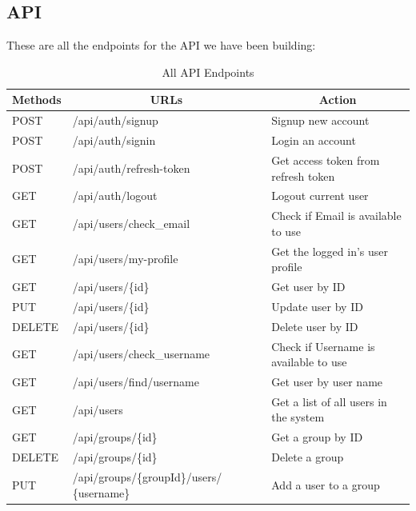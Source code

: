 \subsection{API}
These are all the endpoints for the API we have been building: 
\begin{longtable}{|p{2cm}|p{5cm}|p{5cm}|}
\caption{All API Endpoints}
\label{table:APIendpoints} \\

\hline \multicolumn{1}{|c|}{\textbf{Methods}} & \multicolumn{1}{c|}{\textbf{URLs}} & \multicolumn{1}{c|}{\textbf{Action}} \\ \hline 
\endfirsthead
  \hline 
POST & /api/auth/signup & Signup new account\\ \hline
POST & /api/auth/signin & Login an account\\ \hline
POST & /api/auth/refresh-token & Get access token from refresh token \\ \hline
GET & /api/auth/logout & Logout current user\\ \hline
GET & /api/users/check\_email & Check if Email is available to use \\ \hline
GET &
/api/users/my-profile &
Get the logged in's user profile \\ \hline

GET &
/api/users/\{id\} &
Get user by ID \\ \hline

PUT &
/api/users/\{id\} &
Update user by ID \\ \hline

DELETE &
/api/users/\{id\} &
Delete user by ID \\ \hline

GET &
/api/users/check\_username &
Check if Username is available to use \\ \hline

GET &
/api/users/find/{username} &
Get user by user name \\ \hline

GET &
/api/users &
Get a list of all users in the system \\ \hline

GET &
/api/groups/\{id\} &
Get a group by ID \\ \hline

DELETE &
/api/groups/\{id\} &
Delete a group \\ \hline

PUT &
/api/groups/\{groupId\}/users/ \newline\{username\} &
Add a user to a group \\ \hline


\end{longtable}
